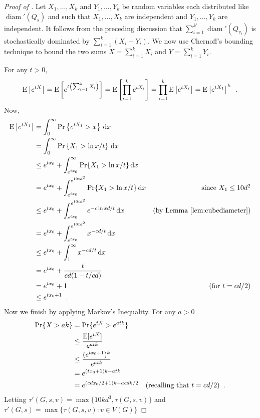 \documentclass{patmorin}
\DeclareMathOperator{\diam}{diam}
\begin{document}
\begin{proof}[Proof of ]
Let $X_1,\ldots,X_k$ and $Y_1,\ldots,Y_k$ be random variables each
distributed like $\diam'(Q_s)$ and such that
$X_1,\ldots,X_k$ are independent and $Y_1,\ldots,Y_k$ are independent.
It follows from the preceding discussion that 
$\sum_{i=1}^{k'}\diam'(Q_{v_i})$ is
stochastically dominated by $\sum_{i=1}^k (X_i+Y_i)$.  We now use
Chernoff's bounding technique to bound the two sums $X=\sum_{i=1}^k X_i$
and $Y=\sum_{i=1}^k Y_i$.

For any $t>0$,
\[
    \mathrm{E}\left[e^{tX}\right] 
      = \mathrm{E}\left[e^{t\left(\sum_{i=1}^k X_i\right)}\right] 
      = \mathrm{E}\left[\prod_{i=1}^k e^{tX_i}\right]
      = \prod_{i=1}^k\mathrm{E}\left[e^{tX_i}\right]
      = \mathrm{E}\left[e^{tX_1}\right]^k \enspace .
\]
Now, 
\begin{align*}
   \E\left[e^{tX_1}\right]
     & = \int_0^\infty \Pr\left\{e^{tX_1} > x\right\}\,\mathrm{d}x \\
     & = \int_0^\infty \Pr\left\{X_1 > \ln x/t\right\}\,\mathrm{d}x \\
     & \le e^{tx_0} + \int_{e^{tx_0}}^\infty \Pr\{X_1 > \ln x/t\}\,\mathrm{d}x \\
     & = e^{tx_0} + \int_{e^{tx_0}}^{e^{10td^2}} \Pr\{X_1 > \ln x/t\}\,\mathrm{d}x 
       & \mbox{since $X_1\le 10d^2$} \\
     & \le e^{tx_0} + \int_{e^{tx_0}}^{e^{10td^2}} e^{-c\ln x d/t}\,\mathrm{d}x
     & \text{(by \lemref{cubediameter})} \\
     & =  e^{tx_0} + \int_{e^{tx_0}}^{e^{10td^2}} x^{-cd/t}\,\mathrm{d}x \\
     & \le  e^{tx_0} + \int_{1}^{\infty} x^{-cd/t}\,\mathrm{d}x \\
     & = e^{tx_0} + \frac{t}{cd(1-t/cd)} \\
     & = e^{tx_0} + 1 & \text{(for $t=cd/2$)} \\
     & \le e^{tx_0+1}  \enspace .
\end{align*}
Now we finish by applying Markov's Inequality.  For any $a>0$
\begin{align*}
   \Pr\{X > ak \} 
    &= \Pr\{ e^{tX} > e^{atk}\} \\
    &\le \frac{\mathrm{E}[e^{tX}]}{e^{atk}} \\
    &\le \frac{(e^{tx_0+1})^k}{e^{atk}} \\
    &= e^{(tx_0+1)k - atk} \\
    &= e^{(cdx_0/2+1)k - acdk/2} &\text{(recalling that $t=cd/2$)} \enspace .
\end{align*}
Letting $\tau'(G,s,v)=\max\{10kd^3, \tau(G,s,v)\}$
and 
$\tau'(G,s)=\max\{\tau(G,s,v):v\in V(G)\}$

\end{proof}
\end{document}
